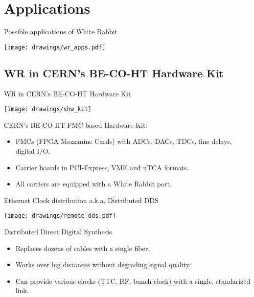\documentclass[compress,red]{beamer}
\begin{document}
\section{Applications}

\begin{frame}{Possible applications of White Rabbit}
\begin{center}
\texttt{[image: drawings/wr\_apps.pdf]}
\end{center}
\end{frame}


\subsection{WR in CERN's BE-CO-HT Hardware Kit}
\begin{frame}{WR in CERN's BE-CO-HT Hardware Kit}
\begin{center}

  \texttt{[image: drawings/shw\_kit]}

  \begin{block}{CERN's BE-CO-HT FMC-based Hardware Kit:}
    \begin{itemize}
    \item FMCs (FPGA Mezzanine Cards) with ADCs, DACs, TDCs, fine delays, digital I/O.
    \item Carrier boards in PCI-Express, VME and uTCA formats.
    \item All carriers are equipped with a White Rabbit port.
    \end{itemize}
  \end{block}

\end{center}
\end{frame}


\begin{frame}{Ethernet Clock distribution a.k.a. Distributed DDS}
  \begin{center}
    \texttt{[image: drawings/remote\_dds.pdf]}
  \end{center}
  \begin{block}{Distributed Direct Digital Synthesis}
    \begin{itemize}
    \item Replaces dozens of cables with a single fiber.
    \item Works over big distances without degrading signal quality.
    \item Can provide various clocks (TTC, RF, bunch clock) with a single, standarized link.
    \end{itemize}
  \end{block}
\end{frame}
\end{document}
